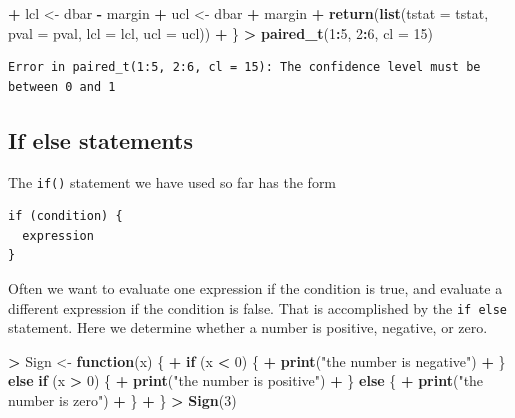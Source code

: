 \documentclass[]{krantz}
\makeatletter
\newenvironment{Shaded}{\begin{snugshade}}{\end{snugshade}}
\newcommand{\ControlFlowTok}[1]{\textcolor[rgb]{0.27,0.27,0.27}{\textbf{#1}}}
\newcommand{\DataTypeTok}[1]{\textcolor[rgb]{0.27,0.27,0.27}{#1}}
\newcommand{\DecValTok}[1]{\textcolor[rgb]{0.06,0.06,0.06}{#1}}
\newcommand{\KeywordTok}[1]{\textcolor[rgb]{0.27,0.27,0.27}{\textbf{#1}}}
\newcommand{\NormalTok}[1]{#1}
\newcommand{\OperatorTok}[1]{\textcolor[rgb]{0.43,0.43,0.43}{\textbf{#1}}}
\newcommand{\StringTok}[1]{\textcolor[rgb]{0.5,0.5,0.5}{#1}}
\newenvironment{kframe}{%
\medskip{}
\setlength{\fboxsep}{.8em}
 \def\at@end@of@kframe{}%
 \ifinner\ifhmode%
  \def\at@end@of@kframe{\end{minipage}}%
  \begin{minipage}{\columnwidth}%
 \fi\fi%
 \def\FrameCommand##1{\hskip\@totalleftmargin \hskip-\fboxsep
 \colorbox{shadecolor}{##1}\hskip-\fboxsep
     \hskip-\linewidth \hskip-\@totalleftmargin \hskip\columnwidth}%
 \MakeFramed {\advance\hsize-\width
   \@totalleftmargin\z@ \linewidth\hsize
   \@setminipage}}%
 {\par\unskip\endMakeFramed%
 \at@end@of@kframe}
\renewenvironment{Shaded}{\begin{kframe}}{\end{kframe}}
\makeatother
\begin{document}
\begin{Shaded}
\begin{Highlighting}[]
\OperatorTok{+}\StringTok{   }\NormalTok{lcl <-}\StringTok{ }\NormalTok{dbar }\OperatorTok{-}\StringTok{ }\NormalTok{margin}
\OperatorTok{+}\StringTok{   }\NormalTok{ucl <-}\StringTok{ }\NormalTok{dbar }\OperatorTok{+}\StringTok{ }\NormalTok{margin}
\OperatorTok{+}\StringTok{   }\KeywordTok{return}\NormalTok{(}\KeywordTok{list}\NormalTok{(}\DataTypeTok{tstat =}\NormalTok{ tstat, }\DataTypeTok{pval =}\NormalTok{ pval, }\DataTypeTok{lcl =}\NormalTok{ lcl, }\DataTypeTok{ucl =}\NormalTok{ ucl))}
\OperatorTok{+}\StringTok{ }\NormalTok{\}}
\OperatorTok{>}\StringTok{ }\KeywordTok{paired_t}\NormalTok{(}\DecValTok{1}\OperatorTok{:}\DecValTok{5}\NormalTok{, }\DecValTok{2}\OperatorTok{:}\DecValTok{6}\NormalTok{, }\DataTypeTok{cl =} \DecValTok{15}\NormalTok{)}
\end{Highlighting}
\end{Shaded}

\begin{verbatim}
Error in paired_t(1:5, 2:6, cl = 15): The confidence level must be between 0 and 1
\end{verbatim}

\hypertarget{if-else-statements}{%
\subsection{If else statements}\label{if-else-statements}}

The \texttt{if()} statement we have used so far has the form

\begin{verbatim}
if (condition) {
  expression
}
\end{verbatim}

Often we want to evaluate one expression if the condition is true, and evaluate a different expression if the condition is false. That is accomplished by the \texttt{if\ else} statement. Here we determine whether a number is positive, negative, or zero.

\begin{Shaded}
\begin{Highlighting}[]
\OperatorTok{>}\StringTok{ }\NormalTok{Sign <-}\StringTok{ }\ControlFlowTok{function}\NormalTok{(x) \{}
\OperatorTok{+}\StringTok{   }\ControlFlowTok{if}\NormalTok{ (x }\OperatorTok{<}\StringTok{ }\DecValTok{0}\NormalTok{) \{}
\OperatorTok{+}\StringTok{     }\KeywordTok{print}\NormalTok{(}\StringTok{"the number is negative"}\NormalTok{)}
\OperatorTok{+}\StringTok{   }\NormalTok{\} }\ControlFlowTok{else} \ControlFlowTok{if}\NormalTok{ (x }\OperatorTok{>}\StringTok{ }\DecValTok{0}\NormalTok{) \{}
\OperatorTok{+}\StringTok{     }\KeywordTok{print}\NormalTok{(}\StringTok{"the number is positive"}\NormalTok{)}
\OperatorTok{+}\StringTok{   }\NormalTok{\} }\ControlFlowTok{else}\NormalTok{ \{}
\OperatorTok{+}\StringTok{     }\KeywordTok{print}\NormalTok{(}\StringTok{"the number is zero"}\NormalTok{)}
\OperatorTok{+}\StringTok{   }\NormalTok{\}}
\OperatorTok{+}\StringTok{ }\NormalTok{\}}
\OperatorTok{>}\StringTok{ }\KeywordTok{Sign}\NormalTok{(}\DecValTok{3}\NormalTok{)}
\end{Highlighting}
\end{Shaded}
\end{document}
